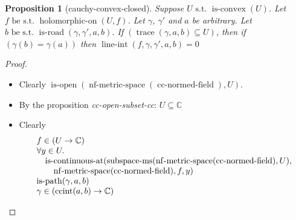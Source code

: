 \documentclass[11pt]{article}
\theoremstyle{plain}
\newtheorem{proposition}{Proposition}
\begin{document}
\begin{proposition}[cauchy-convex-closed]
Suppose $U \text{ s.t. } \operatorname{is\text{-}convex}(U)$. Let $f \text{ be s.t. } \operatorname{holomorphic\text{-}on}(U, f)$. Let $\gamma$, $\gamma'$ and $a$ be arbitrary. Let $b \text{ be s.t. } \operatorname{is\text{-}road}(\gamma, \gamma', a, b)$. If $(\operatorname{trace}(\gamma, a, b) \subseteq U)$, then if $(\gamma(b) = \gamma(a))$ then  $\operatorname{line\text{-}int}(f, \gamma, \gamma', a, b) = 0$
\end{proposition}

\begin{proof}
\begin{itemize}[leftmargin=2.8em, itemsep=4pt, parsep=1pt]
  \item[\textbf{8}] Clearly $\operatorname{is\text{-}open}(\operatorname{nf\text{-}metric\text{-}space}(\operatorname{cc\text{-}normed\text{-}field}), U)$.
  \item[\textbf{9}] By the proposition \emph{cc-open-subset-cc}: $U \subseteq \mathbb{C}$
  \item[\textbf{10--13}] Clearly
\begin{equation*}
\begin{array}{@{}l@{}}
f \in (U \to \mathbb{C}) \\
\begin{array}{@{}l@{}} \forall y \in U. \\ \quad \operatorname{is\text{-}continuous\text{-}at}(\operatorname{subspace\text{-}ms}(\operatorname{nf\text{-}metric\text{-}space}(\operatorname{cc\text{-}normed\text{-}field}), U), \\ \quad \quad \operatorname{nf\text{-}metric\text{-}space}(\operatorname{cc\text{-}normed\text{-}field}), f, y) \end{array} \\
\operatorname{is\text{-}path}(\gamma, a, b) \\
\gamma \in (\operatorname{ccint}(a, b) \to \mathbb{C})
\end{array}
\end{equation*}


\end{itemize}
\end{proof}
\end{document}
